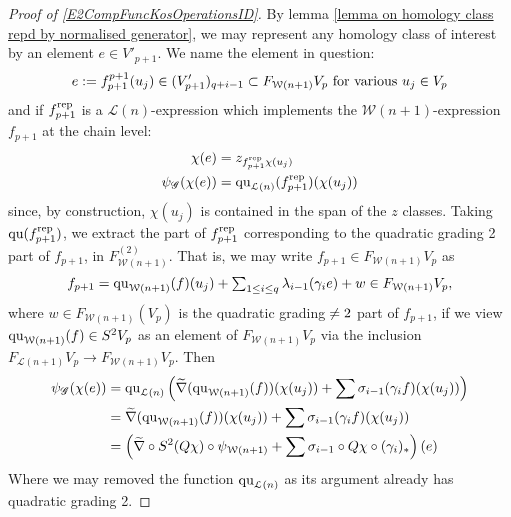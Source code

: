 \documentclass[11pt]{amsart}
\theoremstyle{plain}
\theoremstyle{definition}
\renewcommand{\to}{\longrightarrow}
\newcommand{\scrQ}{\mathscr{Q}}
\newcommand{\scrR}{\mathscr{R}}
\newcommand{\scrT}{\mathscr{T}}
\newcommand{\scrY}{\mathscr{Y}}
\newcommand{\scrI}{\mathscr{I}}
\newcommand{\scrO}{\mathscr{O}}
\newcommand{\scrP}{\mathscr{P}}
\newcommand{\scrS}{\mathscr{S}}
\newcommand{\scrG}{\mathscr{G}}
\newcommand{\scrH}{\mathscr{H}}
\newcommand{\scrJ}{\mathscr{J}}
\newcommand{\scrK}{\mathscr{K}}
\newcommand{\scrL}{\mathscr{L}}
\newcommand{\scrZ}{\mathscr{Z}}
\newcommand{\scrN}{\mathscr{N}}
\newcommand{\scrM}{\mathscr{M}}
\newcommand{\calW}{\mathcal{W}}
\newcommand{\calL}{\mathcal{L}}
\theoremstyle{plain}
\newcommand{\BSW}{{\scrG}}%
\newcommand{\quadratic}{\textup{qu}}
\begin{document}
\begin{Composite functor spectral sequences}
\begin{tricky proofs of operation compatibilities}
\begin{proof}[Proof of \ref{E2CompFuncKosOperationsID}]
By lemma \ref{lemma on homology class repd by normalised generator}, we may represent any homology class of interest by an element $e\in V'_{p+1}$. We name the element in question:
\[e:=f^{p+1}_{p+1}(u_j)\in (V'_{p+1})_{q+i-1}\subset F_{\calW(n+1)}V_p\textup{ for various }u_j\in V_{p}\]
and if $f_{p+1}^\textup{rep}$ is a $\calL(n)$-expression which implements the $\calW(n+1)$-expression $f_{p+1}$ at the chain level:
\begin{alignat*}{2}
\chi(e)&=z_{f_{p+1}^\textup{rep}\chi(u_j)}\\
\psi_{\BSW}(\chi(e))&=\quadratic_{\calL(n)}(f_{p+1}^\textup{rep})(\chi(u_j))
\end{alignat*}
since, by construction, $\chi(u_j)$ is contained in the span of the $z$ classes.  Taking $\quadratic(f_{p+1}^\textup{rep})$, we extract the part of $f_{p+1}^\textup{rep}$ corresponding to the quadratic grading 2 part of $f_{p+1}$, in $F_{\calW(n+1)}^{(2)}$. That is, we may write $f_{p+1}\in F_{\calW(n+1)}V_p$ as
\[f_{p+1}=\quadratic_{\calW(n+1)}(f)(u_j)+\textstyle\sum_{1\leq i\leq q} \lambda_{i-1}(\gamma_ie) + w\in F_{\calW(n+1)}V_p,\]
where $w\in F_{\calW(n+1)}(V_p)$ is the quadratic grading$\makebox[0cm][l]{}\neq2$ part of $f_{p+1}$, if we view $\quadratic_{\calW(n+1)}(f)\in S^2V_p$ as an element of $F_{\calW(n+1)}V_p$ via the inclusion $F_{\calL(n+1)}V_p\to F_{\calW(n+1)}V_p$. Then
\begin{alignat*}{2}
\psi_\BSW(\chi(e))&=\quadratic_{\calL(n)} \left(\widetilde{\nabla}(\quadratic_{\calW(n+1)}(f))(\chi(u_j))+\sum \sigma_{i-1}(\gamma_if)(\chi(u_j))\right)\\
&=\widetilde{\nabla}(\quadratic_{\calW(n+1)}(f))(\chi(u_j))+\sum \sigma_{i-1}(\gamma_if)(\chi(u_j))\\
&=\left(\widetilde{\nabla}\circ S^2(Q\chi)\circ \psi_{\calW(n+1)}+\sum\sigma_{i-1}\circ Q\chi\circ(\gamma_i)_*\right)(e)
\end{alignat*}
Where we may removed the function $\quadratic_{\calL(n)}$ as its argument already has quadratic grading 2.
\end{proof}


\end{tricky proofs of operation compatibilities}
\end{Composite functor spectral sequences}
\end{document}
